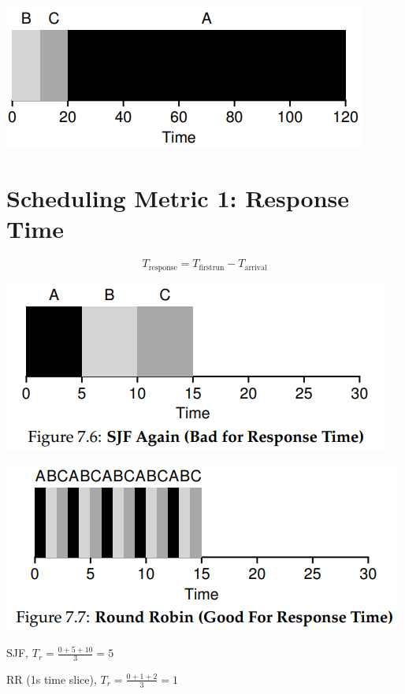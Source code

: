 \documentclass[8pt,a4paper,landscape]{extarticle}
\begin{document}
\begin{multicols*}{3}
\begin{minipage}{.5\linewidth}
\begin{align*}
  \end{align*}
\end{minipage}
\begin{minipage}{.5\linewidth}
  \includegraphics[width=\linewidth]{imgs/sched_fifo3}
\end{minipage}
\section*{Scheduling Metric 1: Response Time}
\begin{equation}
  \label{eq:reponse}
  T_{\text{response}} = T_{\text{firstrun}} - T_{\text{arrival}}
\end{equation}
\begin{minipage}{.5\linewidth}
  \includegraphics[width=\linewidth]{imgs/sched_rr1}
\end{minipage}
\begin{minipage}{.5\linewidth}
  \includegraphics[width=\linewidth]{imgs/sched_rr}
\end{minipage}
\begin{minipage}{.5\linewidth}
  \centering
  SJF, $T_{r} = \frac{0+5+10}{3} = 5$
\end{minipage}
\begin{minipage}{.5\linewidth}
  RR (1s time slice), $T_{r} = \frac{0+1+2}{3} = 1$
\end{minipage}

\end{multicols*}
\end{document}
